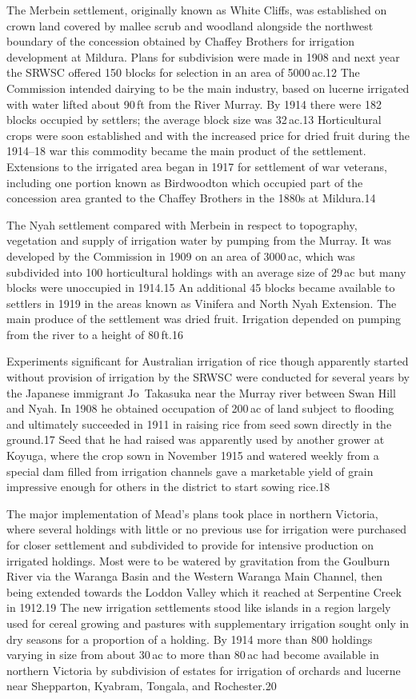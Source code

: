 The Merbein settlement, originally known as White Cliffs, was
established on crown land covered by mallee scrub and woodland
alongside the northwest boundary of the concession obtained by Chaffey
Brothers for irrigation development at Mildura.  Plans for subdivision
were made in 1908 and next year the SRWSC offered 150 blocks for
selection in an area of 5000\,ac.12 The Commission intended dairying
to be the main industry, based on lucerne irrigated with water lifted
about 90\,ft from the River Murray.  By 1914 there were 182 blocks
occupied by settlers; the average block size was 32\,ac.13
Horticultural crops were soon established and with the increased price
for dried fruit during the 1914--18 war this commodity became the main
product of the settlement.  Extensions to the irrigated area began in
1917 for settlement of war veterans, including one portion known as
Birdwoodton which occupied part of the concession area granted to the
Chaffey Brothers in the 1880s at Mildura.14

The Nyah settlement compared with Merbein in respect to topography,
vegetation and supply of irrigation water by pumping from the
Murray. It was developed by the Commission in 1909 on an area of
3000\,ac, which was subdivided into 100 horticultural holdings with an
average size of 29\,ac but many blocks were unoccupied in 1914.15 An
additional 45 blocks became available to settlers in 1919 in the areas
known as Vinifera and North Nyah Extension.  The main produce of the
settlement was dried fruit.  Irrigation depended on pumping from the
river to a height of 80\,ft.16

Experiments significant for Australian irrigation of rice though
apparently started without provision of irrigation by the SRWSC were
conducted for several years by the Japanese immigrant Jo~Takasuka near
the Murray river between Swan Hill and Nyah.  In 1908 he obtained
occupation of 200\,ac of land subject to flooding and ultimately
succeeded in 1911 in raising rice from seed sown directly in the
ground.17 Seed that he had raised was apparently used by another
grower at Koyuga, where the crop sown in November 1915 and watered
weekly from a special dam filled from irrigation channels gave a
marketable yield of grain impressive enough for others in the district
to start sowing rice.18

The major implementation of Mead's plans took place in northern
Victoria, where several holdings with little or no previous use for
irrigation were purchased for closer settlement and subdivided to
provide for intensive production on irrigated holdings.  Most were to
be watered by gravitation from the Goulburn River via the Waranga
Basin and the Western Waranga Main Channel, then being extended
towards the Loddon Valley which it reached at Serpentine Creek in
1912.19 The new irrigation settlements stood like islands in a region
largely used for cereal growing and pastures with supplementary
irrigation sought only in dry seasons for a proportion of a holding.
By 1914 more than 800 holdings varying in size from about 30\,ac to
more than 80\,ac had become available in northern Victoria by
subdivision of estates for irrigation of orchards and lucerne near
Shepparton, Kyabram, Tongala, and Rochester.20

